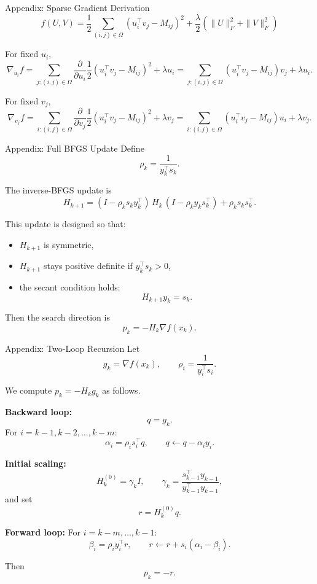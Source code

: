 \documentclass[aspectratio=169,usenames,dvipsnames]{beamer}
\begin{document}
\begin{frame}{Appendix: Sparse Gradient Derivation}
\[
f(U,V)=\frac12\sum_{(i,j)\in\Omega}(u_i^\top v_j-M_{ij})^2
+\frac{\lambda}{2}\left(\|U\|_F^2+\|V\|_F^2\right)
\]

For fixed \(u_i\),
\[
\nabla_{u_i} f
=
\sum_{j:(i,j)\in\Omega}
\frac{\partial}{\partial u_i}
\frac12 (u_i^\top v_j-M_{ij})^2
+\lambda u_i
=
\sum_{j:(i,j)\in\Omega}(u_i^\top v_j-M_{ij})v_j+\lambda u_i.
\]

For fixed \(v_j\),
\[
\nabla_{v_j} f
=
\sum_{i:(i,j)\in\Omega}
\frac{\partial}{\partial v_j}
\frac12 (u_i^\top v_j-M_{ij})^2
+\lambda v_j
=
\sum_{i:(i,j)\in\Omega}(u_i^\top v_j-M_{ij})u_i+\lambda v_j.
\]
\end{frame}


\begin{frame}{Appendix: Full BFGS Update}
Define
\[
\rho_k=\frac{1}{y_k^\top s_k}.
\]

The inverse-BFGS update is
\[
H_{k+1}
=
(I-\rho_k s_k y_k^\top)\,H_k\,(I-\rho_k y_k s_k^\top)
+\rho_k s_k s_k^\top.
\]

This update is designed so that:
\begin{itemize}
\item \(H_{k+1}\) is symmetric,
\item \(H_{k+1}\) stays positive definite if \(y_k^\top s_k>0\),
\item the secant condition holds:
\[
H_{k+1}y_k=s_k.
\]
\end{itemize}

Then the search direction is
\[
p_k=-H_k\nabla f(x_k).
\]
\end{frame}

\begin{frame}{Appendix: Two-Loop Recursion}
Let
\[
g_k=\nabla f(x_k),
\qquad
\rho_i=\frac{1}{y_i^\top s_i}.
\]

We compute \(p_k=-H_k g_k\) as follows.

\textbf{Backward loop:}
\[
q=g_k.
\]
For \(i=k-1,k-2,\dots,k-m\):
\[
\alpha_i=\rho_i s_i^\top q,
\qquad
q\leftarrow q-\alpha_i y_i.
\]

\textbf{Initial scaling:}
\[
H_k^{(0)}=\gamma_k I,
\qquad
\gamma_k=\frac{s_{k-1}^\top y_{k-1}}{y_{k-1}^\top y_{k-1}},
\]
and set
\[
r=H_k^{(0)}q.
\]

\textbf{Forward loop:}
For \(i=k-m,\dots,k-1\):
\[
\beta_i=\rho_i y_i^\top r,
\qquad
r\leftarrow r+s_i(\alpha_i-\beta_i).
\]

Then
\[
p_k=-r.
\]
\end{frame}
\end{document}
